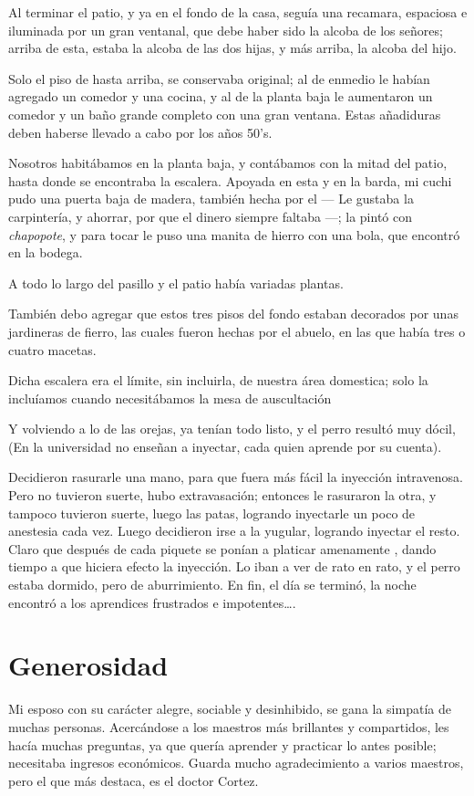 \documentclass[letterpaper, 12pt]{book}
\begin{document}
Al terminar el patio, y ya en el fondo de la casa, seguía una recamara, espaciosa e iluminada por un gran ventanal, que debe haber sido la alcoba de los señores; arriba de esta, estaba la alcoba de las dos hijas, y más arriba, la alcoba del hijo.

Solo el piso de hasta arriba, se conservaba original; al de enmedio le habían agregado un comedor y una cocina, y al de la planta baja le aumentaron un comedor y un baño grande completo con una gran ventana. Estas añadiduras deben haberse llevado a cabo por los años 50's. 

Nosotros habitábamos en la planta baja, y contábamos con la mitad del patio, hasta donde se encontraba la escalera. Apoyada en esta y en la barda, mi cuchi pudo una puerta baja de madera, también hecha por el --- Le gustaba la carpintería, y ahorrar, por que el dinero siempre faltaba ---; la pintó con {\it chapopote}, y para tocar le puso una manita de hierro con una bola, que encontró en la bodega.

A todo lo largo del pasillo y el patio había variadas plantas. 

También debo agregar que estos tres pisos del fondo estaban decorados por unas jardineras de fierro, las cuales fueron hechas por el abuelo, en las que había tres o cuatro macetas. 

Dicha escalera era el límite, sin incluirla, de nuestra área domestica; solo la incluíamos cuando necesitábamos la mesa de auscultación

Y volviendo a lo de las orejas, ya tenían todo listo, y el perro resultó muy dócil, (En la universidad no enseñan a inyectar, cada quien aprende por su cuenta).

Decidieron rasurarle una mano, para que fuera más fácil la inyección intravenosa. Pero no tuvieron suerte, hubo extravasación; entonces le rasuraron la otra, y tampoco tuvieron suerte, luego las patas, logrando inyectarle un poco de anestesia cada vez. Luego decidieron  irse a la yugular, logrando inyectar el resto. Claro que después de cada piquete se ponían a platicar amenamente , dando tiempo a que hiciera efecto la inyección. Lo iban a ver de rato en rato, y el perro estaba dormido, pero de aburrimiento. En fin, el día se terminó, la noche encontró a los aprendices frustrados e impotentes\ldots.
\chapter{Generosidad}
Mi esposo con su carácter alegre, sociable y desinhibido, se gana la simpatía de muchas personas. Acercándose a los maestros más brillantes y compartidos, les hacía muchas preguntas, ya que quería aprender y practicar lo antes posible; necesitaba ingresos económicos. Guarda mucho agradecimiento a varios maestros, pero el que más destaca, es el doctor Cortez.
\end{document}
